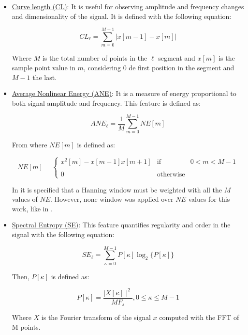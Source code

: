 \begin{itemize}
	\item \underline{Curve length (CL)}: It is useful for observing amplitude and frequency changes and dimensionality of the signal. It is defined with the following equation:
	
	\begin{equation}
	\label{Eq: Curve_Length}
	CL_{\ell}=\sum_{m=0}^{M-1}\lvert x[m-1]-x[m]\lvert
	\end{equation}
	
	Where $ M $ is the total number of points in the $ \ell $ segment and $ x[m] $ is the sample point value in $ m $, considering 0 de first position in the segment and $ M-1 $ the last.
	
	\item \underline{Average Nonlinear Energy (ANE)}: It is a measure of energy proportional to both signal amplitude and frequency. This feature is defined as:
	
	\begin{equation}
	\label{Eq: Avg_Nonlinear_Energy}
	ANE_{\ell}=\frac{1}{M}\sum_{m=0}^{M-1}NE[m]
	\end{equation}
	
	From where $ NE[m] $ is defined as:
	
	\begin{equation}
	\label{Eq: Nonlinear_Energy}
	NE[m]=\left\{\begin{array}{lcl}
	x^{2}[m]-x[m-1]x[m+1] & \mbox{if} & 0<m<M-1\\
	&   &   \\
	0 & \mbox{otherwise} & 
	\end{array}\right.
	\end{equation}
	
	In \cite{d2003epileptic} it is specified that a Hanning window must be weighted with all the $ M $ values of $ NE $. However, none window was applied over $ NE $ values for this work, like in \cite{zhao2015classifying,zhao2013combining}.
	
	\item \underline{Spectral Entropy (SE)}: This feature quantifies regularity and order in the signal with the following equation:
	
	\begin{equation}
	\label{Eq: Spectral_Entropy}
	SE_{\ell}=\sum_{\kappa=0}^{M-1}P[\kappa]\log_{2}\{P[\kappa]\}
	\end{equation}
	
	Then, $ P[\kappa] $ is defined as:
	
	\begin{equation}
	\label{Eq: Spectrum_Prob}
	P[\kappa]=\frac{\mid X[\kappa]\mid^{2}}{MF_{s}}, 0\leq\kappa\leq M-1
	\end{equation}
	
	Where $ X $ is the Fourier transform of the signal $ x $ computed with the FFT of M points.
	
\end{itemize}

